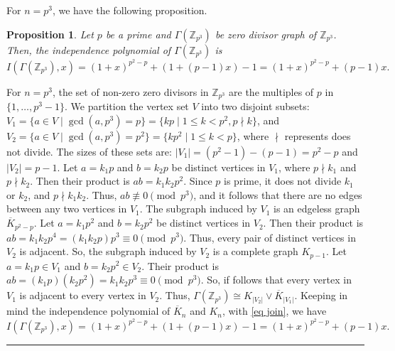 \documentclass[12pt,twoside]{article}
\newtheorem{proposition}[theorem]{Proposition}
\renewenvironment{proof}{{\noindent\bfseries Proof.}}{\qed}
\def\qed{\nolinebreak\hfill\rule{.2cm}{.2cm}\par\addvspace{.5cm}}
\begin{document}
For $n=p^{3}$, we have the following proposition.
\begin{proposition}
	Let $p$ be a prime and $\varGamma(\mathbb{Z}_{p^3})$ be zero divisor graph of $\mathbb{Z}_{p^3}$. Then, the independence polynomial of $\varGamma(\mathbb{Z}_{p^3})$ is
	$$I(\varGamma(\mathbb{Z}_{p^3}), x) = (1+x)^{p^2-p} + (1+(p-1)x) - 1 = (1+x)^{p^2-p} + (p-1)x.$$
\end{proposition}
\begin{proof}
	For $n=p^3$, the set of non-zero zero divisors in $\mathbb{Z}_{p^3}$ are the multiples of $p$ in $\{1, \dots, p^3-1\}$. We partition the vertex set $V$ into two disjoint subsets: $V_1 = \{a \in V \mid \gcd(a, p^3)=p\} = \{kp \mid 1 \le k < p^2, p \nmid k\}$, and  $V_2 = \{a \in V \mid \gcd(a, p^3)=p^2\} = \{kp^2 \mid 1 \le k < p\}$, where $\nmid$ represents does not divide. The sizes of these sets are:  $|V_1| = (p^2-1) - (p-1) = p^2-p$ and  $|V_2| = p-1$.  Let $a=k_1 p$ and $b=k_2 p$ be distinct vertices in $V_1$, where $p \nmid k_1$ and $p \nmid k_2$. Then their product is $ab = k_1 k_2 p^2$. Since $p$ is prime, it does not divide $k_1$ or $k_2$, and $p \nmid k_1 k_2$. Thus, $ab \not\equiv 0 \pmod{p^3}$, and it follows that there are no edges between any two vertices in $V_1$. The subgraph induced by $V_1$ is an edgeless graph $\overline{K}_{p^2-p}$. Let $a=k_1 p^2$ and $b=k_2 p^2$ be distinct vertices in $V_2$. Then their product is $ab = k_1 k_2 p^4 = (k_1 k_2 p) p^3 \equiv 0 \pmod{p^3}$. Thus, every pair of distinct vertices in $V_2$ is adjacent. So, the subgraph induced by $V_2$ is a complete graph $K_{p-1}$. Let $a=k_1 p \in V_1$ and $b=k_2 p^2 \in V_2$. Their product is $ab = (k_1 p)(k_2 p^2) = k_1 k_2 p^3 \equiv 0 \pmod{p^3}$. So, if follows that every vertex in $V_1$ is adjacent to every vertex in $V_2$. Thus, $ \varGamma(\mathbb{Z}_{p^3})\cong K_{|V_{2}|}\vee \overline{K}_{|V_{1}|}.$ Keeping in mind the independence polynomial of $\overline{K}_{n}$ and $K_{n}$, with \eqref{eq join}, we have
	$$I(\varGamma(\mathbb{Z}_{p^3}), x) = (1+x)^{p^2-p} + (1+(p-1)x) - 1 = (1+x)^{p^2-p} + (p-1)x.$$
\end{proof}
\end{document}
